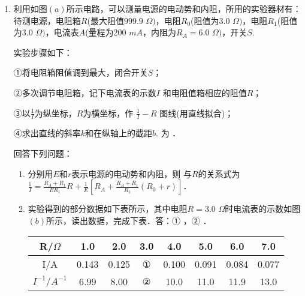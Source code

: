 \begin{enumerate}[leftmargin=0em]
\begin{enumerate}
\end{enumerate}




\newpage
\item 
{}
利用如图$ (a) $所示电路，可以测量电源的电动势和内阻，所用的实验器材有：
待测电源，电阻箱$ R $(最大阻值$ 999.9 $ $ \Omega ) $，电阻$ R_{0} $(阻值为$ 3.0 $ $ \Omega ) $，电阻$ R_{1} $(阻值为$ 3.0 $ $ \Omega ) $，电流表$ A $(量程为$ 200 $ $ m{A} $，内阻为$ R_{A} =6.0 $ $ \Omega ) $，开关$ S $. 
\begin{figure}[h!]
\centering
 \qquad 
  \qquad 
  
\end{figure}



实验步骤如下：

①将电阻箱阻值调到最大，闭合开关$ S $；

②多次调节电阻箱，记下电流表的示数$ I $ 和电阻值箱相应的阻值$ R $；

③以$ \frac{1}{I} $为纵坐标，$ R $为横坐标，作 ­$\frac { 1 } { I } - R$ 图线(用直线拟合)；

④求出直线的斜率$ k $和在纵轴上的截距$ b $. 为 \underlinegap ．

回答下列问题：
\begin{enumerate}
\renewcommand{\labelenumii}{(\arabic{enumii})}
\item 
分别用$ E $和$ r $表示电源的电动势和内阻，则 与$ R $的关系式为$\frac { 1 } { I } = \frac { R _ { A } + R _ { 1 } } { E R _ { 1 } } R + \frac { 1 } { E } \left[ R _ { A } + \frac { R _ { A } + R _ { 1 } } { R _ { 1 } } \left( R _ { 0 } + r \right) \right]$．


\item 
实验得到的部分数据如下表所示，其中电阻$ R=3.0 $ $ \Omega $时电流表的示数如图$ (b) $所示，读出数据，完成下表．答：①  
，②  
．
\begin{table}[h!]
\centering 
\begin{tabular}{|c|c|c|c|c|c|c|c|}
\hline 
R/$ \Omega $ & 1.0 & 2.0 & 3.0 & 4.0 & 5.0 & 6.0 & 7.0
\\
\hline
I/A & 0.143 & 0.125 & ① & 0.100 & 0.091 & 0.084 & 0.077
\\
\hline
$ I^{-1}/A^{-1} $ & 6.99 & 8.00 & ② & 10.0 & 11.0 & 11.9 & 13.0\\ 
\hline 
\end{tabular}
\end{table} 



\end{enumerate}
\end{enumerate}
